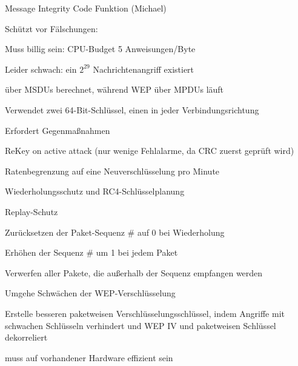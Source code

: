\documentclass[a4paper]{article}
\begin{document}
\begin{multicols}{3}
      Message Integrity Code Funktion (Michael)
      \begin{itemize*}
            \item Schützt vor Fälschungen:
            \item Muss billig sein: CPU-Budget 5 Anweisungen/Byte
            \item Leider schwach: ein $2^{29}$ Nachrichtenangriff existiert
            \item über MSDUs berechnet, während WEP über MPDUs läuft
            \item Verwendet zwei 64-Bit-Schlüssel, einen in jeder Verbindungsrichtung
            \item Erfordert Gegenmaßnahmen
            \begin{itemize*}
                  \item ReKey on active attack (nur wenige Fehlalarme, da CRC zuerst geprüft wird)
                  \item Ratenbegrenzung auf eine Neuverschlüsselung pro Minute
            \end{itemize*}
      \end{itemize*}

      Wiederholungsschutz und RC4-Schlüsselplanung
      \begin{itemize*}
            \item Replay-Schutz
            \begin{itemize*}
                  \item Zurücksetzen der Paket-Sequenz \# auf 0 bei Wiederholung
                  \item Erhöhen der Sequenz \# um 1 bei jedem Paket
                  \item Verwerfen aller Pakete, die außerhalb der Sequenz empfangen werden
            \end{itemize*}
            \item Umgehe Schwächen der WEP-Verschlüsselung
            \begin{itemize*}
                  \item Erstelle besseren paketweisen Verschlüsselungsschlüssel, indem Angriffe mit schwachen Schlüsseln verhindert und WEP IV und paketweisen Schlüssel dekorreliert
                  \item muss auf vorhandener Hardware effizient sein
            \end{itemize*}
      \end{itemize*}


\end{multicols}
\end{document}
